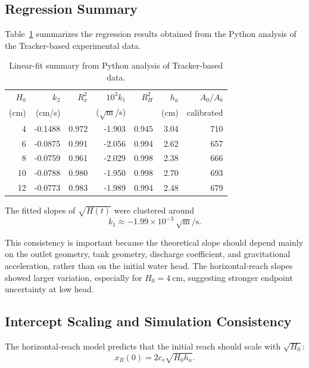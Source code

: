 \documentclass[11pt,letterpaper]{article}
\begin{document}
\subsection{Regression Summary}

Table~\ref{tab:fit_summary} summarizes the regression results obtained from the Python analysis of the Tracker-based experimental data.

\begin{table}[H]
\centering
\caption{Linear-fit summary from Python analysis of Tracker-based data.}
\label{tab:fit_summary}
\small
\begin{tabular}{@{}rrrrrrr@{}}
\toprule
$H_0$ & $k_2$ & $R^2_x$ & $10^3k_1$ & $R^2_H$ & $h_a$ & $A_0/A_b$ \\
(cm) & (cm/s) & & ($\sqrt{\mathrm{m}}$/s) & & (cm) & calibrated \\
\midrule
4  & -0.1488 & 0.972 & -1.903 & 0.945 & 3.04 & 710 \\
6  & -0.0875 & 0.991 & -2.056 & 0.994 & 2.62 & 657 \\
8  & -0.0759 & 0.961 & -2.029 & 0.998 & 2.38 & 666 \\
10 & -0.0788 & 0.980 & -1.950 & 0.998 & 2.70 & 693 \\
12 & -0.0773 & 0.983 & -1.989 & 0.994 & 2.48 & 679 \\
\bottomrule
\end{tabular}
\end{table}

The fitted slopes of $\sqrt{H(t)}$ were clustered around
\begin{equation}
    k_1\approx -1.99\times 10^{-3}~\sqrt{\mathrm{m}}/\mathrm{s}.
\end{equation}

This consistency is important because the theoretical slope should depend mainly on the outlet geometry, tank geometry, discharge coefficient, and gravitational acceleration, rather than on the initial water head. The horizontal-reach slopes showed larger variation, especially for $H_0=4~\mathrm{cm}$, suggesting stronger endpoint uncertainty at low head.

\subsection{Intercept Scaling and Simulation Consistency}

The horizontal-reach model predicts that the initial reach should scale with $\sqrt{H_0}$:
\begin{equation}
    x_R(0)=2c_v\sqrt{H_0h_a}.
\end{equation}
\end{document}
